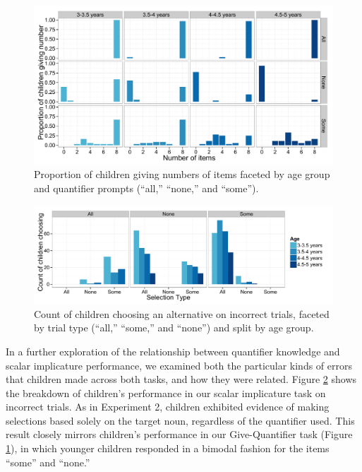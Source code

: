 \documentclass[man]{apa2}
\begin{document}
{\begin{figure} 
 \begin{center} 
  \includegraphics[scale=.5]{figures/exp3_GQspread.pdf} 
  \caption{\label{fig:GQ_spread} Proportion of children giving numbers of items faceted by age group and quantifier prompts (``all,'' ``none,'' and ``some'').} 
 \end{center} 
\end{figure}


\begin{figure} 
 \begin{center} 
  \includegraphics[scale=.5]{figures/exp3_wrong.pdf} 
  \caption{\label{fig:exp3_wrong} Count of children choosing an alternative on incorrect trials, faceted by trial type (``all,'' ``some,'' and ``none'') and split by age group.} 
 \end{center} 
\end{figure}

In a further exploration of the relationship between quantifier knowledge and scalar implicature performance, we examined both the particular kinds of errors that children made across both tasks, and how they were related. Figure \ref{fig:exp3_wrong} shows the breakdown of children's performance in our scalar implicature task on incorrect trials. As in Experiment 2, children exhibited evidence of making selections based solely on the target noun, regardless of the quantifier used. This result closely mirrors children's performance in our Give-Quantifier task (Figure \ref{fig:GQ_spread}), in which younger children responded in a bimodal fashion for the items ``some'' and ``none.'' 


}
\end{document}
